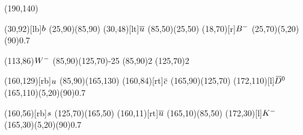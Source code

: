 \documentclass{standalone}
\begin{document}
\begin{axopicture}(190,140)

  \Text(30,92)[lb]{${b}$}       %
  \Line[arrow](25,90)(85,90)        %
  \Text(30,48)[lt]{${\overline {{u}}}$}    %
  \Line[arrow](85,50)(25,50)        %
  \Text(18,70)[r]{${{{B}^-}}$}            %
  \GOval(25,70)(5,20)(90){0.7}      %
                                    
  \Text(113,86){\small{${W^-}$}}      %
  \Photon(85,90)(125,70){-2}{5}     %
  \Vertex(85,90){2}                 %
  \Vertex(125,70){2}                %
                                    
  \Text(160,129)[rb]{${u}$}     %
  \Line[arrow](85,90)(165,130)      %
  \Text(160,84)[rt]{${\overline {{c}}}$}   %
  \Line[arrow](165,90)(125,70)      %
  \Text(172,110)[l]{${{\kern 0.18em\overline{\kern -0.18em D}}{}^0}$}         %
  \GOval(165,110)(5,20)(90){0.7}    %
                                    
  \Text(160,56)[rb]{${s}$}      %
  \Line[arrow](125,70)(165,50)      %
  \Text(160,11)[rt]{${\overline {{u}}}$}   %
  \Line[arrow](165,10)(85,50)       %
  \Text(172,30)[l]{${{K}^-}$}           %
  \GOval(165,30)(5,20)(90){0.7}     %
                                    
\end{axopicture}
\end{document}
